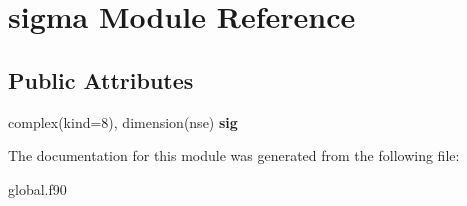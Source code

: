 \hypertarget{classsigma}{\section{sigma Module Reference}
\label{classsigma}
}
\subsection*{Public Attributes}
\begin{DoxyCompactItemize}
\item 
\hypertarget{classsigma_abc276541d1e489d546f7da001362c5a6}{complex(kind=8), dimension(nse) {\bfseries sig}}\label{classsigma_abc276541d1e489d546f7da001362c5a6}

\end{DoxyCompactItemize}


The documentation for this module was generated from the following file\-:\begin{DoxyCompactItemize}
\item 
global.\-f90\end{DoxyCompactItemize}

